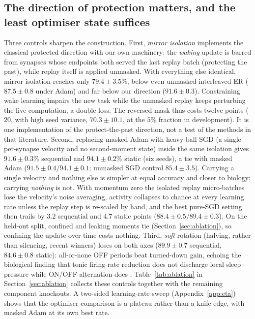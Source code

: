 \documentclass{article}
\begin{document}
\subsection{The direction of protection matters, and the least optimiser state suffices}
\label{sec:direction}
Three controls sharpen the construction. First, \emph{mirror isolation} implements the
classical protected direction with our own machinery: the \emph{waking} update is barred
from synapses whose endpoints both served the last replay batch (protecting the past), while
replay itself is applied unmasked. With everything else identical, mirror isolation reaches
only $79.4\pm3.5\%$, below even unmasked interleaved ER ($87.5\pm0.8$ under Adam) and far
below our direction ($91.6\pm0.3$). Constraining wake learning impairs the new task while
the unmasked replay keeps perturbing the live computation, a double loss. The reversed mask
thus costs twelve points ($20$, with high seed variance, $70.3\pm10.1$, at the $5\%$
fraction in development). It is one implementation of the protect-the-past direction, not a
test of the methods in that literature.
Second, replacing masked Adam with heavy-ball SGD (a single per-synapse velocity and no
second-moment state) inside the same isolation gives $\mathbf{91.6\pm0.3\%}$ sequential and
$94.1\pm0.2\%$ static (six seeds), a tie with masked Adam ($91.5\pm0.4/94.1\pm0.1$; unmasked
SGD control $85.4\pm3.5$). Carrying a single velocity and nothing else is simpler at equal
accuracy and closer to biology; carrying \emph{nothing} is not. With momentum zero the
isolated replay micro-batches lose the velocity's noise averaging, activity collapses to
chance at every learning rate unless the replay step is re-scaled by hand, and the best
pure-SGD setting then trails by $3.2$ sequential and $4.7$ static points
($88.4\pm0.5/89.4\pm0.3$). On the held-out split, confined and leaking moments tie
(Section~\ref{sec:ablation}), so confining the update over time costs nothing.
Third, \emph{soft} rotation (halving, rather than silencing, recent winners) loses on both
axes ($89.9\pm0.7$ sequential, $84.6\pm0.8$ static): all-or-none OFF periods beat turned-down
gain, echoing the biological finding that tonic firing-rate reduction does not discharge
local sleep pressure while ON/OFF alternation does \citep{driessen2026}.
Table~\ref{tab:ablation} in Section~\ref{sec:ablation} collects these controls together with
the remaining component knockouts. A two-sided learning-rate sweep (Appendix~\ref{app:eta})
shows that the optimiser comparison is a plateau rather than a knife-edge, with masked Adam
at its own best rate.
\end{document}
